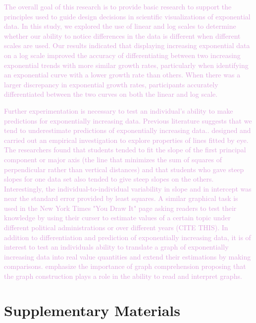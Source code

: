\documentclass[]{interact}
\theoremstyle{plain}%
\theoremstyle{definition}
\theoremstyle{remark}
\begin{document}
\textcolor{Plum}{
The overall goal of this research is to provide basic research to support the principles used to guide design decisions in scientific visualizations of exponential data. 
In this study, we explored the use of linear and log scales to determine whether our ability to notice differences in the data is different when different scales are used. 
Our results indicated that displaying increasing exponential data on a log scale improved the accuracy of differentiating between two increasing exponential trends with more similar growth rates, particularly when identifying an exponential curve with a lower growth rate than others. When there was a larger discrepancy in exponential growth rates, participants accurately differentiated between the two curves on both the linear and log scale.
}

\textcolor{Plum}{
Further experimentation is necessary to test an individual's ability to make predictions for exponentially increasing data. 
Previous literature suggests that we tend to underestimate predictions of exponentially increasing data.\citep{jones_generalized_1979, jones_polynomial_1977, wagenaar_extrapolation_1978}.
\citep{mosteller_eye_1981} designed and carried out an empirical investigation to explore properties of lines fitted by eye.
The researchers found that students tended to fit the slope of the first principal component or major axis (the line that minimizes the sum of squares of perpendicular rather than vertical distances) and that students who gave steep slopes for one data set also tended to give steep slopes on the others. 
Interestingly, the individual-to-individual variability in slope and in intercept was near the standard error provided by least squares.
A similar graphical task is used in the New York Times "You Draw It" page asking readers to test their knowledge by using their curser to estimate values of a certain topic under different political administrations or over different years (CITE THIS).
In addition to differentiation and prediction of exponentially increasing data, it is of interest to test an individuals ability to translate a graph of exponentially increasing data into real value quantities and extend their estimations by making comparisons. 
\citep{friel_making_2001} emphasize the importance of graph comprehension proposing that the graph construction plays a role in the ability to read and interpret graphs.
}

\hypertarget{supplementary-materials}{%
\section*{Supplementary Materials}\label{supplementary-materials}}
\end{document}
